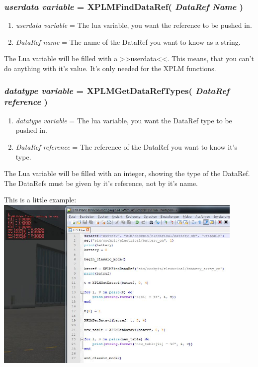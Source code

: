 \documentclass[11pt,parskip=half,a4paper]{scrartcl}
\begin{document}
\subsubsection{\emph{userdata variable} = XPLMFindDataRef( \emph{DataRef Name} )}

\begin{enumerate}
	\item \emph{userdata variable} = The lua variable, you want the reference to be pushed in.
	\item \emph{DataRef name} = The name of the DataRef you want to know as a string.
\end{enumerate}

The Lua variable will be filled with a >>userdata<<. This means, that you can't do anything with it's value. It's only needed for the XPLM functions.

\subsubsection{\emph{datatype variable} = XPLMGetDataRefTypes( \emph{DataRef reference} )}

\begin{enumerate}
	\item \emph{datatype variable} = The lua variable, you want the DataRef type to be pushed in.
	\item \emph{DataRef reference} = The reference of the DataRef you want to know it's type.
\end{enumerate}

The Lua variable will be filled with an integer, showing the type of the DataRef. The DataRefs must be given by it's reference, not by it's name.

\newpage
This is a little example:\\
\includegraphics[width=12cm]{FWLclassic.jpg}
\end{document}
